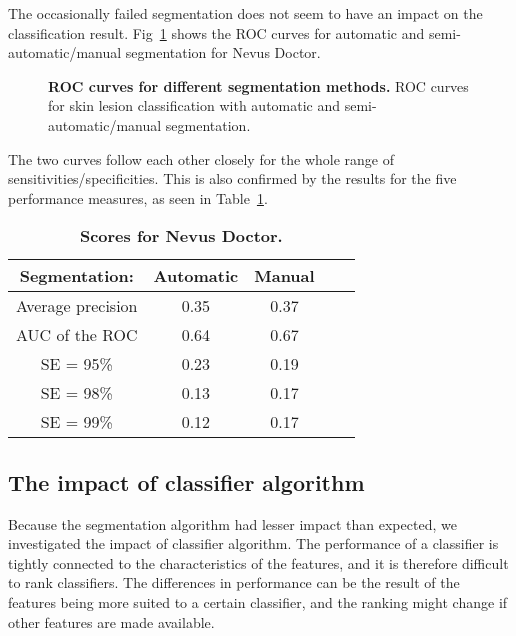 \documentclass[10pt,letterpaper]{article}
\begin{document}
The occasionally failed segmentation does not seem to have an impact on the classification result.
Fig~\ref{fig:ROC} shows the ROC curves for automatic and semi-automatic/manual segmentation for Nevus Doctor. 
\begin{figure}[!h]
\caption{{\bf ROC curves for different segmentation methods.}
ROC curves for skin lesion classification with automatic and semi-automatic/manual segmentation.}
\label{fig:ROC}
\end{figure}
The two curves follow each other closely for the whole range of sensitivities/specificities. 
This is also confirmed by the results for the five performance measures, as seen in Table~\ref{tab:ND_Rankings}.
\begin{table}[!ht]
\centering
\caption{
{\bf Scores for Nevus Doctor.}}
\begin{tabular}{c | c | c | c | c}
        Segmentation: &{Automatic} & {Manual} \\
        \hline
  Average precision & 0.35 & 0.37 \\
  AUC of the ROC & 0.64 & 0.67 \\
  SE = 95\% & 0.23 & 0.19 \\
  SE = 98\%  & 0.13 & 0.17 \\
  SE = 99\%  & 0.12  & 0.17
\end{tabular}
\label{tab:ND_Rankings}
\end{table}

\subsection*{The impact of classifier algorithm} 

Because the segmentation algorithm had lesser impact than expected, we investigated the impact of classifier algorithm.
The performance of a classifier is tightly connected to the characteristics of the features, and it is therefore difficult to rank classifiers.
The differences in performance can be the result of the features being more suited to a certain classifier, and the ranking might change if other features are made available. 
\end{document}
